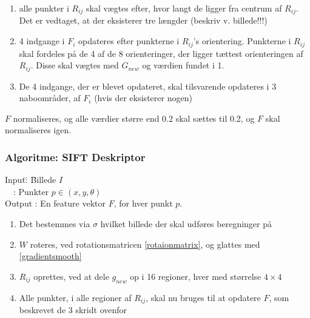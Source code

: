 \begin{enumerate}
\item{ alle punkter i $R_{ij}$ skal vægtes efter, hvor langt de ligger fra centrum af $R_{ij}$. Det er vedtaget, at der eksisterer tre længder (beskriv v. billede!!!)}
\item{ 4 indgange i $F_i$ opdateres efter punkterne i $R_{ij}$'s orientering. Punkterne i $R_{ij}$ skal fordeles på de 4 af de 8 orienteringer, der ligger tættest orienteringen af $R_{ij}$. Disse skal vægtes med $G_{new}$ og værdien fundet i 1. }
\item{ De 4 indgange, der er blevet opdateret, skal tilsvarende opdateres i 3 naboområder, af $F_i$ (hvis der eksisterer nogen)}
\end{enumerate}

$F$ normaliseres, og alle værdier større end 0.2 skal sættes til 0.2, og $F$ skal normaliseres igen.
\subsubsection*{Algoritme: SIFT Deskriptor}
\begin{tabbing}
Input\quad \= : \= Billede $I$\\
$\text{ }$ \> : \> Punkter $p \in (x, y, \theta)$ \\
Output \text{ } \> : \> En feature vektor $F$, for hver punkt $p$.
\end{tabbing}
\begin{enumerate}
\item Det bestemmes via $\sigma$ hvilket billede der skal udføres beregninger på
\item $W$ roteres, ved rotationsmatricen \eqref{rotaionmatrix}, og glattes med \eqref{gradientsmooth}
\item $R_{ij}$ oprettes, ved at dele $g_{new}$ op i 16 regioner, hver med størrelse $4\times4$
\item Alle punkter, i alle regioner af $R_{ij}$, skal nu bruges til at opdatere $F$, som beskrevet de 3 skridt ovenfor
\end{enumerate}